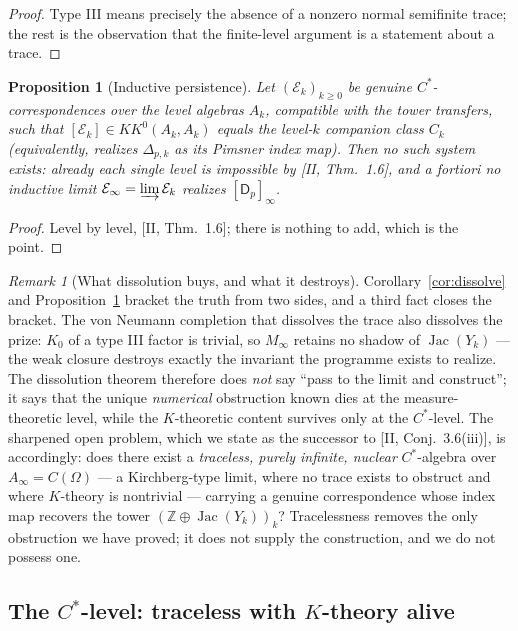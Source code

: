 \documentclass[11pt]{amsart}
\numberwithin{equation}{section}
\newtheorem{proposition}[theorem]{Proposition}
\theoremstyle{definition}
\theoremstyle{remark}
\newtheorem{remark}[theorem]{Remark}
\newcommand{\Z}{\mathbb{Z}}
\newcommand{\cE}{\mathcal{E}}
\newcommand{\Jac}{\operatorname{Jac}}
\begin{document}
\begin{proof}
Type III means precisely the absence of a nonzero normal semifinite trace; the rest is
the observation that the finite-level argument is a statement about a trace.
\end{proof}

\begin{proposition}[Inductive persistence]\label{prop:inductive}
Let $(\cE_k)_{k\ge0}$ be genuine $C^*$-correspondences over the level algebras $A_k$,
compatible with the tower transfers, such that $[\cE_k]\in KK^0(A_k,A_k)$ equals the
level-$k$ companion class $C_k$ (equivalently, realizes $\Delta_{p,k}$ as its Pimsner
index map). Then no such system exists: already each single level is impossible by
[II, Thm.~1.6], and a fortiori no inductive limit
$\cE_\infty=\varinjlim\cE_k$ realizes $[\mathsf D_p]_\infty$.
\end{proposition}

\begin{proof}
Level by level, [II, Thm.~1.6]; there is nothing to add, which is the point.
\end{proof}

\begin{remark}[What dissolution buys, and what it destroys]\label{rem:honest}
Corollary~\ref{cor:dissolve} and Proposition~\ref{prop:inductive} bracket the truth
from two sides, and a third fact closes the bracket. The von Neumann completion that
dissolves the trace also dissolves the prize: $K_0$ of a type III factor is trivial,
so $M_\infty$ retains no shadow of $\Jac(Y_k)$ --- the weak closure destroys exactly
the invariant the programme exists to realize. The dissolution theorem therefore does
\emph{not} say ``pass to the limit and construct''; it says that the unique
\emph{numerical} obstruction known dies at the measure-theoretic level, while the
$K$-theoretic content survives only at the $C^*$-level. The sharpened open problem,
which we state as the successor to [II, Conj.~3.6(iii)], is accordingly: does there
exist a \emph{traceless, purely infinite, nuclear} $C^*$-algebra over
$A_\infty=C(\Omega)$ --- a Kirchberg-type limit, where no trace exists to obstruct and
where $K$-theory is nontrivial --- carrying a genuine correspondence whose index map
recovers the tower $(\Z\oplus\Jac(Y_k))_k$? Tracelessness removes the only obstruction
we have proved; it does not supply the construction, and we do not possess one.
\end{remark}

\subsection{The \texorpdfstring{$C^*$}{C*}-level: traceless with
\texorpdfstring{$K$}{K}-theory alive}\label{subsec:kirchberg}
\end{document}
